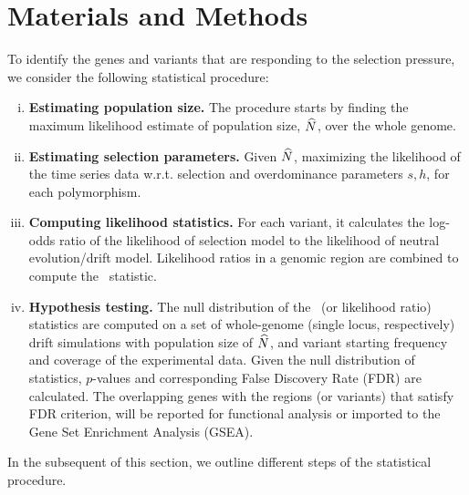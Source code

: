 \section{Materials and Methods}
\label{sec:method}
To identify the genes and variants that are responding to the selection 
pressure, we
consider the following statistical procedure:
\begin{enumerate}[(i)]
	\item  {\bf Estimating population size.} The procedure starts by 
	finding the
	maximum likelihood estimate of population size, 
	$\widehat{N}$, over the whole genome.
	\item {\bf Estimating selection parameters.} Given $\widehat{N}$, 
	maximizing the 
	likelihood of the time series data w.r.t. 
	selection and overdominance parameters $s,h$, for each	
	polymorphism.
	\item {\bf Computing likelihood statistics.} For each variant, it 
	calculates the log-odds 
	ratio of the likelihood of selection model to the likelihood of neutral
	evolution/drift model. Likelihood ratios in a genomic region
	are combined to compute the \comale\ statistic. 
	\item {\bf Hypothesis testing.} The null distribution of the \comale\ (or 
	likelihood ratio) 
	statistics are computed on 
	a set of whole-genome (single locus, respectively) drift simulations with 
	population size of $\widehat{N}$, and variant starting frequency and coverage of 
	the experimental data. Given the null distribution of statistics, 
	$p$-values and corresponding False Discovery Rate (FDR) are calculated.
	 The overlapping genes with the 
	regions (or variants) that 
	satisfy FDR criterion, 
	will be reported for functional analysis or imported to the Gene Set 
	Enrichment Analysis (GSEA).
\end{enumerate}
In the subsequent of this section, we outline different steps of the 
statistical procedure.
